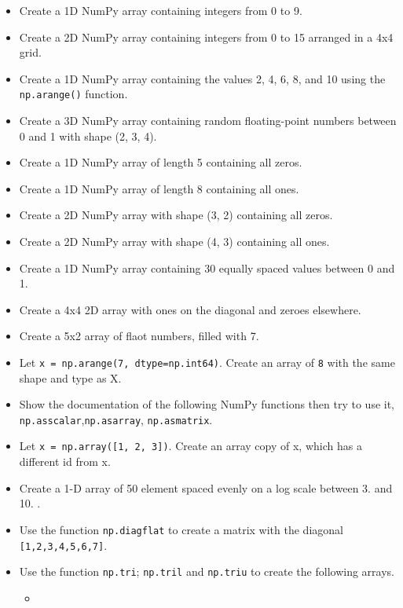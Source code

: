 \documentclass[11pt]{article}
\begin{document}
  \begin{itemize}
  \item
    Create a 1D NumPy array containing integers from 0 to 9.
  \item
    Create a 2D NumPy array containing integers from 0 to 15 arranged in
    a 4x4 grid.
  \item
    Create a 1D NumPy array containing the values 2, 4, 6, 8, and 10
    using the \texttt{np.arange()} function.
  \item
    Create a 3D NumPy array containing random floating-point numbers
    between 0 and 1 with shape (2, 3, 4).
  \item
    Create a 1D NumPy array of length 5 containing all zeros.
  \item
    Create a 1D NumPy array of length 8 containing all ones.
  \item
    Create a 2D NumPy array with shape (3, 2) containing all zeros.
  \item
    Create a 2D NumPy array with shape (4, 3) containing all ones.
  \item
    Create a 1D NumPy array containing 30 equally spaced values between
    0 and 1.
  \item
    Create a 4x4 2D array with ones on the diagonal and zeroes
    elsewhere.
  \item
    Create a 5x2 array of flaot numbers, filled with 7.
  \item
    Let \texttt{x\ =\ np.arange(7,\ dtype=np.int64)}. Create an array of
    \texttt{8} with the same shape and type as X.
  \item
    Show the documentation of the following NumPy functions then try to
    use it, \texttt{np.asscalar},\texttt{np.asarray},
    \texttt{np.asmatrix}.
  \item
    Let \texttt{x\ =\ np.array({[}1,\ 2,\ 3{]})}. Create an array copy
    of x, which has a different id from x.
  \item
    Create a 1-D array of 50 element spaced evenly on a log scale
    between 3. and 10. .
  \item
  Use the function \texttt{np.diagflat} to create a matrix with
    the diagonal \texttt{{[}1,2,3,4,5,6,7{]}}.
  \item
  Use the function \texttt{np.tri}; \texttt{np.tril} and \texttt{np.triu} to
    create the following arrays.

\begin{itemize}
  \item 
  

\end{itemize}
\end{itemize}
\end{document}
